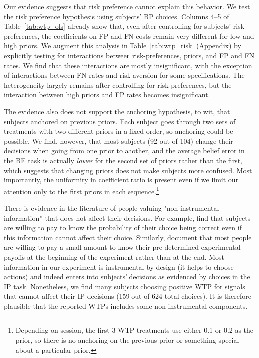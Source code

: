 \documentclass[12pt,a4paper]{article}
\begin{document}
Our evidence suggests that risk preference cannot explain this behavior. We test the risk preference hypothesis using subjects' BP choices. Columns 4--5 of Table~\ref{tab:wtp_ols} already show that, even after controlling for subjects' risk preferences, the coefficients on FP and FN costs remain very different for low and high priors.
We augment this analysis in Table~\ref{tab:wtp_risk} (Appendix) by explicitly testing for interactions between risk-preferences, priors, and FP and FN rates. We find that these interactions are mostly insignificant, with the exception of interactions between FN rates and risk aversion for some specifications. The heterogeneity largely remains after controlling for risk preferences, but the interaction between high priors and FP rates becomes insignificant.

The evidence also does not support the anchoring hypothesis, to wit, that subjects anchored on previous priors. Each subject goes through two sets of treatments with two different priors in a fixed order, so anchoring could be possible.  We find, however, that most subjects (92 out of 104) change their decisions when going from one prior to another, and the average belief error in the BE task is actually \emph{lower} for the second set of priors rather than the first, which suggests that changing priors does not make subjects more confused. Most importantly, the uniformity in coefficient ratio is present even if we limit our attention only to the first priors in each sequence.\footnote{Depending on session, the first 3 WTP treatments use either 0.1 or 0.2 as the prior, so there is no anchoring on the previous prior or something special about a particular prior.}

There is evidence in the literature of people valuing "non-instrumental information'' that does not affect their decisions. For example, \citet{eliaz_paying_2010} find that subjects are willing to pay to know the probability of their choice being correct even if this information cannot affect their choice. Similarly, \citet{ganguly_fantasy_2017} document that most people are willing to pay a small amount to know their pre-determined experimental payoffs at the beginning of the experiment rather than at the end. Most information in our experiment is instrumental by design (it helps to choose actions) and indeed enters into subjects' decisions as evidenced by choices in the IP task. Nonetheless, we find many subjects choosing positive WTP for signals that cannot affect their IP decisions (159 out of 624 total choices). It is therefore plausible that the reported WTPs includes some non-instrumental components. 
\end{document}
